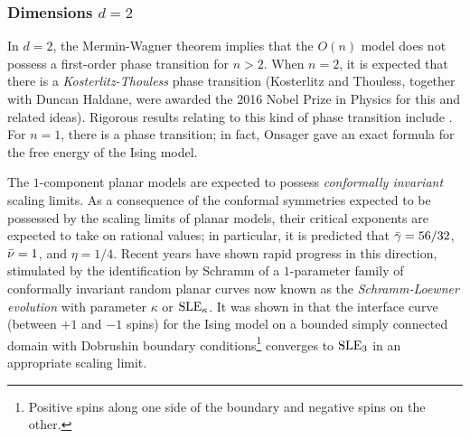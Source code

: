 \subsubsection{Dimensions $d = 2$}

In $d = 2$, the Mermin-Wagner theorem \cite{MW66} implies that the $O(n)$ model does
not possess a first-order phase transition for $n > 2$. When $n = 2$, it is
expected that there is a \emph{Kosterlitz-Thouless} phase transition \cite{KT73}
(Kosterlitz and Thouless, together with Duncan Haldane, were awarded
the 2016 Nobel Prize in Physics for this and related ideas). Rigorous results relating
to this kind of phase transition include \cite{FS81,Falc12,Falc13}.
For $n = 1$, there is a phase transition; in fact, Onsager \cite{Onsager44} gave an
exact formula for the free energy of the Ising model.

The $1$-component planar models are expected to possess \emph{conformally invariant}
scaling limits. As a consequence of the conformal symmetries expected to be possessed
by the scaling limits of planar models, their critical exponents are expected to take
on rational values; in particular, it is predicted that $\bar\gamma = 56/32$, $\bar\nu = 1$,
and $\eta = 1/4$. Recent years have shown rapid progress in this direction, stimulated
by the identification by Schramm \cite{Schramm00} of a $1$-parameter family of
conformally invariant random planar curves now known as the \emph{Schramm-Loewner
evolution} with parameter $\kappa$ or ${\rm SLE}_\kappa$. It was shown in \cite{CDHKS14}
that the interface curve (between $+ 1$ and $-1$ spins) for the Ising model on a
bounded simply connected domain with Dobrushin boundary
conditions\footnote{Positive spins along one side of the
boundary and negative spins on the other.} converges to ${\rm SLE}_3$ in
an appropriate scaling limit.

